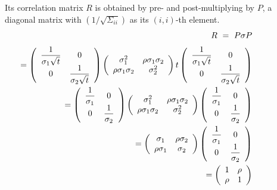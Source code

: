 \documentclass[uplatex,a4j,12pt,dvipdfmx]{jsarticle}
\begin{document}
%
%
Its correlation matrix $R$ is obtained by pre- and post-multiplying by $P$, a diagonal matrix with $(1/\sqrt{\Sigma_{ii}})$ as its $(i,i)$-th element.
%
%
\begin{eqnarray*}
	&& \hspace{-10mm}
	R \ = \ P \mathbb{\sigma} P
	\\[1mm] && \hspace{-20mm} \ =
	\left(
	\begin{array}{cc}
			\dfrac{1}{\sigma_{1} \sqrt{t}} & 0
			\\
			0                              & \dfrac{1}{\sigma_{2} \sqrt{t}}
		\end{array}
	\right)
	\left(
	\begin{array}{cc}
			\sigma_{1}^{2}             & \rho \sigma_{1} \sigma_{2}
			\\
			\rho \sigma_{1} \sigma_{2} & \sigma^{2}_{2}
		\end{array}
	\right)
	t
	\left(
	\begin{array}{cc}
			\dfrac{1}{\sigma_{1} \sqrt{t}} & 0
			\\
			0                              & \dfrac{1}{\sigma_{2} \sqrt{t}}
		\end{array}
	\right)
	\\ && \hspace{-20mm} \ =
	\left(
	\begin{array}{cc}
			\dfrac{1}{\sigma_{1}} & 0
			\\
			0                     & \dfrac{1}{\sigma_{2}}
		\end{array}
	\right)
	\left(
	\begin{array}{cc}
			\sigma_{1}^{2}             & \rho \sigma_{1} \sigma_{2}
			\\
			\rho \sigma_{1} \sigma_{2} & \sigma^{2}_{2}
		\end{array}
	\right)
	\left(
	\begin{array}{cc}
			\dfrac{1}{\sigma_{1}} & 0
			\\
			0                     & \dfrac{1}{\sigma_{2}}
		\end{array}
	\right)
	\\ && \hspace{-20mm} \ =
	\left(
	\begin{array}{cc}
			\sigma_{1}      & \rho \sigma_{2}
			\\
			\rho \sigma_{1} & \sigma_{2}
		\end{array}
	\right)
	\left(
	\begin{array}{cc}
			\dfrac{1}{\sigma_{1}} & 0
			\\
			0                     & \dfrac{1}{\sigma_{2}}
		\end{array}
	\right)
	\\ && \hspace{-20mm} \ =
	\left(
	\begin{array}{cc}
			1    & \rho
			\\
			\rho & 1
		\end{array}
	\right)
\end{eqnarray*}
%
%
\end{document}
